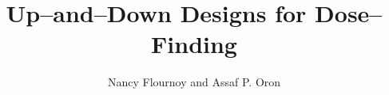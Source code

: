 \documentclass{book}
\begin{document}
\title{Up--and--Down Designs for Dose--Finding}
\author{Nancy Flournoy and Assaf P. Oron}

\begin{doublespace}
\maketitle
\frontmatter
\tableofcontents
\mainmatter
{}

\setcounter{chapter}{24}

\maketitle




\end{doublespace}

\begin{center}
%


\end{center}
\end{document}

